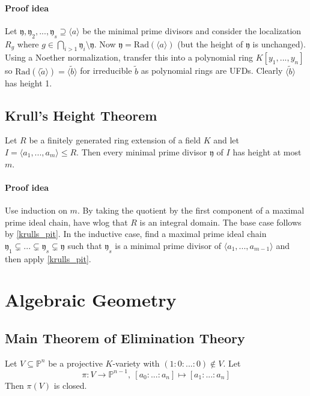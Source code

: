 \documentclass{scrartcl}
\begin{document}
\paragraph{Proof idea} 
Let $\mathfrak{y}, \mathfrak{y}_2, ..., \mathfrak{y}_s \supseteq \langle a \rangle$ be the minimal prime divisors and consider the localization $R_g$ where $g \in \bigcap_{i > 1} \mathfrak{y}_i \setminus \mathfrak{y}$.
Now $\mathfrak{y} = \mathrm{Rad}(\langle a \rangle)$ (but the height of $\mathfrak{y}$ is unchanged).
Using a Noether normalization, transfer this into a polynomial ring $K[y_1, ..., y_n]$ so $\mathrm{Rad}(\langle \tilde{a} \rangle) = \langle \tilde{b} \rangle$ for irreducible $\tilde{b}$ as polynomial rings are UFDs.
Clearly $\langle \tilde{b} \rangle$ has height 1.

\subsection{Krull's Height Theorem}
Let $R$ be a finitely generated ring extension of a field $K$ and let $I = \langle a_1, ..., a_m \rangle \leq R$.
Then every minimal prime divisor $\mathfrak{y}$ of $I$ has height at most $m$.
\paragraph{Proof idea} Use induction on $m$. 
By taking the quotient by the first component of a maximal prime ideal chain, have wlog that $R$ is an integral domain.
The base case follows by \ref{krulls_pit}. 
In the inductive case, find a maximal prime ideal chain $\mathfrak{y}_1 \subsetneq ... \subsetneq \mathfrak{y}_s \subsetneq \mathfrak{y}$ such that $\mathfrak{y}_s$ is a minimal prime divisor of $\langle a_1, ..., a_{m - 1} \rangle$ and then apply \ref{krulls_pit}.

\section{Algebraic Geometry}

\subsection{Main Theorem of Elimination Theory}
Let $V \subseteq \mathbb{P}^n$ be a projective $K$-variety with $(1 : 0 : ... : 0) \notin V$.
Let
\begin{equation*}
    \pi: V \to \mathbb{P}^{n - 1}, \ [a_0 : ... : a_n] \mapsto [a_1 : ... : a_n]
\end{equation*}
Then $\pi(V)$ is closed.
\end{document}
